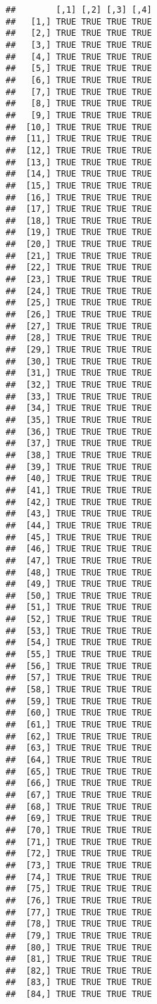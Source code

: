 \documentclass[
]{book}
\begin{document}
\begin{verbatim}
##        [,1] [,2] [,3] [,4]
##   [1,] TRUE TRUE TRUE TRUE
##   [2,] TRUE TRUE TRUE TRUE
##   [3,] TRUE TRUE TRUE TRUE
##   [4,] TRUE TRUE TRUE TRUE
##   [5,] TRUE TRUE TRUE TRUE
##   [6,] TRUE TRUE TRUE TRUE
##   [7,] TRUE TRUE TRUE TRUE
##   [8,] TRUE TRUE TRUE TRUE
##   [9,] TRUE TRUE TRUE TRUE
##  [10,] TRUE TRUE TRUE TRUE
##  [11,] TRUE TRUE TRUE TRUE
##  [12,] TRUE TRUE TRUE TRUE
##  [13,] TRUE TRUE TRUE TRUE
##  [14,] TRUE TRUE TRUE TRUE
##  [15,] TRUE TRUE TRUE TRUE
##  [16,] TRUE TRUE TRUE TRUE
##  [17,] TRUE TRUE TRUE TRUE
##  [18,] TRUE TRUE TRUE TRUE
##  [19,] TRUE TRUE TRUE TRUE
##  [20,] TRUE TRUE TRUE TRUE
##  [21,] TRUE TRUE TRUE TRUE
##  [22,] TRUE TRUE TRUE TRUE
##  [23,] TRUE TRUE TRUE TRUE
##  [24,] TRUE TRUE TRUE TRUE
##  [25,] TRUE TRUE TRUE TRUE
##  [26,] TRUE TRUE TRUE TRUE
##  [27,] TRUE TRUE TRUE TRUE
##  [28,] TRUE TRUE TRUE TRUE
##  [29,] TRUE TRUE TRUE TRUE
##  [30,] TRUE TRUE TRUE TRUE
##  [31,] TRUE TRUE TRUE TRUE
##  [32,] TRUE TRUE TRUE TRUE
##  [33,] TRUE TRUE TRUE TRUE
##  [34,] TRUE TRUE TRUE TRUE
##  [35,] TRUE TRUE TRUE TRUE
##  [36,] TRUE TRUE TRUE TRUE
##  [37,] TRUE TRUE TRUE TRUE
##  [38,] TRUE TRUE TRUE TRUE
##  [39,] TRUE TRUE TRUE TRUE
##  [40,] TRUE TRUE TRUE TRUE
##  [41,] TRUE TRUE TRUE TRUE
##  [42,] TRUE TRUE TRUE TRUE
##  [43,] TRUE TRUE TRUE TRUE
##  [44,] TRUE TRUE TRUE TRUE
##  [45,] TRUE TRUE TRUE TRUE
##  [46,] TRUE TRUE TRUE TRUE
##  [47,] TRUE TRUE TRUE TRUE
##  [48,] TRUE TRUE TRUE TRUE
##  [49,] TRUE TRUE TRUE TRUE
##  [50,] TRUE TRUE TRUE TRUE
##  [51,] TRUE TRUE TRUE TRUE
##  [52,] TRUE TRUE TRUE TRUE
##  [53,] TRUE TRUE TRUE TRUE
##  [54,] TRUE TRUE TRUE TRUE
##  [55,] TRUE TRUE TRUE TRUE
##  [56,] TRUE TRUE TRUE TRUE
##  [57,] TRUE TRUE TRUE TRUE
##  [58,] TRUE TRUE TRUE TRUE
##  [59,] TRUE TRUE TRUE TRUE
##  [60,] TRUE TRUE TRUE TRUE
##  [61,] TRUE TRUE TRUE TRUE
##  [62,] TRUE TRUE TRUE TRUE
##  [63,] TRUE TRUE TRUE TRUE
##  [64,] TRUE TRUE TRUE TRUE
##  [65,] TRUE TRUE TRUE TRUE
##  [66,] TRUE TRUE TRUE TRUE
##  [67,] TRUE TRUE TRUE TRUE
##  [68,] TRUE TRUE TRUE TRUE
##  [69,] TRUE TRUE TRUE TRUE
##  [70,] TRUE TRUE TRUE TRUE
##  [71,] TRUE TRUE TRUE TRUE
##  [72,] TRUE TRUE TRUE TRUE
##  [73,] TRUE TRUE TRUE TRUE
##  [74,] TRUE TRUE TRUE TRUE
##  [75,] TRUE TRUE TRUE TRUE
##  [76,] TRUE TRUE TRUE TRUE
##  [77,] TRUE TRUE TRUE TRUE
##  [78,] TRUE TRUE TRUE TRUE
##  [79,] TRUE TRUE TRUE TRUE
##  [80,] TRUE TRUE TRUE TRUE
##  [81,] TRUE TRUE TRUE TRUE
##  [82,] TRUE TRUE TRUE TRUE
##  [83,] TRUE TRUE TRUE TRUE
##  [84,] TRUE TRUE TRUE TRUE

\end{verbatim}
\end{document}
